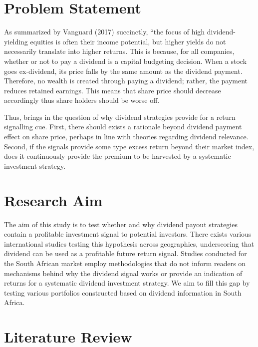 \documentclass[11pt,preprint, authoryear]{elsarticle}
\numberwithin{equation}{section}
\numberwithin{figure}{section}
\numberwithin{table}{section}
\begin{document}
\hypertarget{problem-statement}{%
\section{Problem Statement}\label{problem-statement}}

As summarized by Vanguard (2017) succinctly, ``the focus of high
dividend-yielding equities is often their income potential, but higher
yields do not necessarily translate into higher returns. This is
because, for all companies, whether or not to pay a dividend is a
capital budgeting decision. When a stock goes ex-dividend, its price
falls by the same amount as the dividend payment. Therefore, no wealth
is created through paying a dividend; rather, the payment reduces
retained earnings. This means that share price should decrease
accordingly thus share holders should be worse off.

Thus, brings in the question of why dividend strategies provide for a
return signalling cue. First, there should exists a rationale beyond
dividend payment effect on share price, perhaps in line with theories
regarding dividend relevance. Second, if the signals provide some type
excess return beyond their market index, does it continuously provide
the premium to be harvested by a systematic investment strategy.

\hypertarget{research-aim}{%
\section{Research Aim}\label{research-aim}}

The aim of this study is to test whether and why dividend payout
strategies contain a profitable investment signal to potential
investors. There exists various international studies testing this
hypothesis across geographies, underscoring that dividend can be used as
a profitable future return signal. Studies conducted for the South
African market employ methodologies that do not inform readers on
mechanisms behind why the dividend signal works or provide an indication
of returns for a systematic dividend investment strategy. We aim to fill
this gap by testing various portfolios constructed based on dividend
information in South Africa.

\hypertarget{literature-review}{%
\section{Literature Review}\label{literature-review}}
\end{document}
